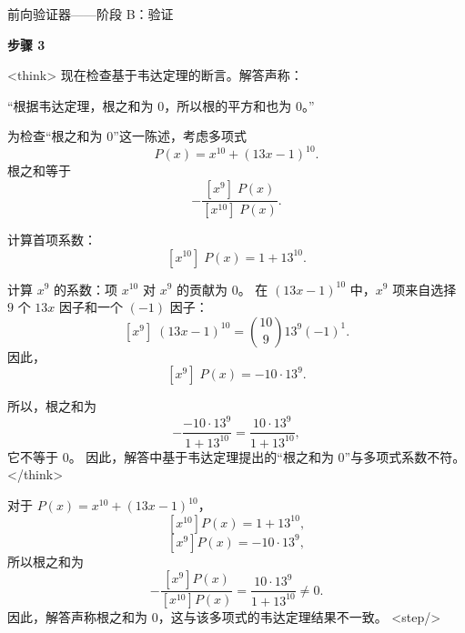 \documentclass[11pt]{article}
\begin{document}
\begin{exbox}{前向验证器——阶段 B：验证}

\textbf{步骤 3}

<think>
现在检查基于韦达定理的断言。解答声称：

“根据韦达定理，根之和为 \(0\)，所以根的平方和也为 \(0\)。”

为检查“根之和为 0”这一陈述，考虑多项式
\[
P(x) = x^{10} + (13x - 1)^{10}.
\]
根之和等于
\[
-\frac{[x^9]\;P(x)}{[x^{10}]\;P(x)}.
\]

计算首项系数：
\[
[x^{10}]\;P(x) = 1 + 13^{10}.
\]

计算 \(x^9\) 的系数：项 \(x^{10}\) 对 \(x^9\) 的贡献为 \(0\)。
在 \((13x-1)^{10}\) 中，\(x^9\) 项来自选择 \(9\) 个 \(13x\) 因子和一个 \((-1)\) 因子：
\[
[x^9]\;(13x-1)^{10} = \binom{10}{9} 13^9 (-1)^{1}.
\]
因此，
\[
[x^9]\;P(x) = -10\cdot 13^9.
\]

所以，根之和为
\[
-\frac{-10\cdot 13^9}{1+13^{10}} = \frac{10\cdot 13^9}{1+13^{10}},
\]
它不等于 \(0\)。
因此，解答中基于韦达定理提出的“根之和为 0”与多项式系数不符。
</think>

对于 \(P(x)=x^{10}+(13x-1)^{10}\)，
\[
[x^{10}]P(x)=1+13^{10},
\]
\[
[x^9]P(x)=-10\cdot 13^9,
\]
所以根之和为
\[
-\frac{[x^9]P(x)}{[x^{10}]P(x)}=\frac{10\cdot 13^9}{1+13^{10}}\neq 0.
\]
因此，解答声称根之和为 \(0\)，这与该多项式的韦达定理结果不一致。
<step/>

\end{exbox}
\end{document}
